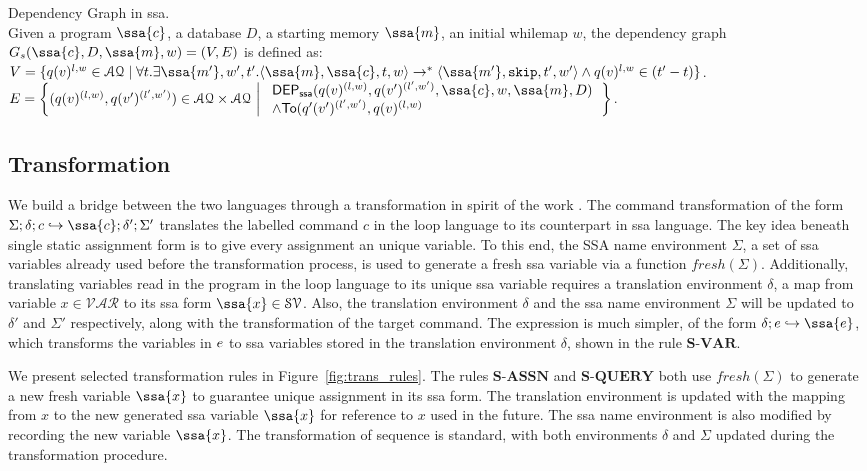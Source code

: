 \begin{defn}
Dependency Graph in ssa.
\\
Given a program $\ssa{c}$, a database $D$, a starting memory $\ssa{m}$, an initial whilemap $w$, the dependency graph $G_{s}(\ssa{c},D,\ssa{m},w) = (V, E)$ is defined as: \\
$V =\{q(v)^{l,w} \in \mathcal{AQ} \mid \forall t. \exists \ssa{m'},  w', t'.  \config{\ssa{m} ,\ssa{c}, t, w}  \to^{*}  \config{\ssa{m'} , \eskip, t', w' }  \land q(v)^{l,w} \in {(t'-t)}  \}$.
\\
$E = \left\{(q(v)^{(l,w)},q(v')^{(l',w')}) \in \mathcal{AQ} \times \mathcal{AQ} 
~ \left \vert ~ \begin{array}{l}
  \mathsf{DEP_{ssa}}(q(v)^{(l,w)},q(v')^{(l',w')}, \ssa{c},w,\ssa{m},D)     \\
  \land \mathsf{To}(q'(v')^{(l',w')}, q(v)^{(l,w)}    
\end{array} \right. 
\right\}$.
\end{defn}

\subsection{Transformation }
We build a bridge between the two languages through a transformation in spirit of the work \cite{vekris2016refinement}. The command transformation of the form $ \Sigma; \delta ; c  \hookrightarrow \ssa{c} ; \delta' ; \Sigma'$ translates the labelled command $c$ in the loop language to its counterpart in ssa language. The key idea beneath single static assignment form is to give every assignment an unique variable. To this end, the SSA name environment $\Sigma$, a set of ssa variables already used before the transformation process, is used to generate a fresh ssa variable via a function $fresh(\Sigma)$. Additionally, translating variables read in the program in the loop language to its unique ssa variable requires a translation environment $\delta$, a map from variable $x \in \mathcal{VAR}$ to its ssa form $\ssa{x} \in \mathcal{SV}$. Also, the translation environment $\delta$ and the ssa name environment $\Sigma$ will be updated to $\delta'$ and $\Sigma'$ respectively, along with the transformation of the target command. The expression is much simpler, of the form $ \delta; \expr \hookrightarrow \ssa{\expr}$, which transforms the variables in $e$ to ssa variables stored in the translation environment $\delta$, shown in the rule $\textbf{S-VAR}$.

We present selected transformation rules in Figure~\ref{fig:trans_rules}. The rules $\textbf{S-ASSN}$ and $\textbf{S-QUERY}$ both use $fresh(\Sigma)$ to generate a new fresh variable $\ssa{x}$ to guarantee unique assignment in its ssa form. The translation environment is updated with the mapping from $x$ to the new generated ssa variable $\ssa{x}$ for reference to $x$ used in the future. The ssa name environment is also modified by recording the new variable $\ssa{x}$. The transformation of sequence is standard, with both environments $\delta$ and $\Sigma$ updated during the transformation procedure.   

